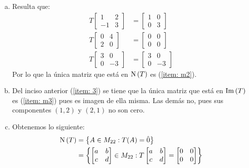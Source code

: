 \begin{solution}
	\begin{enumerate}[a)]
		\item Resulta que:
		\begin{align*}
			T
			\begin{bmatrix}
				1 & 2\\
				-1 & 3
			\end{bmatrix}
			&=
			\begin{bmatrix}
				1 & 0\\
				0 & 3
			\end{bmatrix}\\
			T
			\begin{bmatrix}
				0 & 4\\
				2 & 0
			\end{bmatrix}
			&=
			\begin{bmatrix}
				0 & 0\\
				0 & 0
			\end{bmatrix}\\
			T
			\begin{bmatrix}
				3 & 0\\
				0 & -3
			\end{bmatrix}
			&=
			\begin{bmatrix}
				3 & 0\\
				0 & -3
			\end{bmatrix}
		\end{align*}
		Por lo que la única matriz que está en $\mnuc{T}$ es (\ref{item: m2}).
		\label{item: 3}
		\item Del inciso anterior (\ref{item: 3}) se tiene que la única matriz que está en $\mim{T}$ es (\ref{item: m3}) pues es imagen de ella misma. Las demás no, pues sus componentes $(1, 2)$ y $(2, 1)$ no son cero.
		\item Obtenemos lo siguiente:
		\begin{align*}
			\mnuc{T} &=\set{A\in M_{22}: T(A) =\hat{0}}\\
			&=\set{
				\begin{bmatrix}
					a & b\\
					c & d
				\end{bmatrix}
				\in M_{22}
				: T
				\begin{bmatrix}
					a & b\\
					c & d
				\end{bmatrix}
				=
				\begin{bmatrix}
					0 & 0\\
					0 & 0
				\end{bmatrix}
}
\end{align*}
\end{enumerate}
\end{solution}
